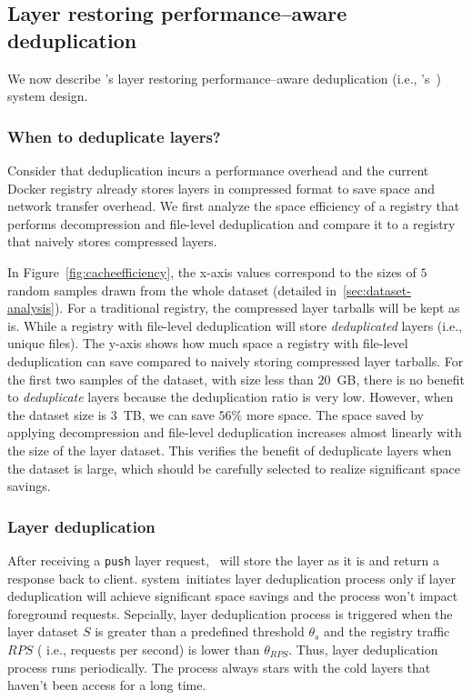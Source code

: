 \subsection{Layer restoring performance--aware deduplication}
\label{sec:dedup-desgin}

We now describe \sysname's layer restoring performance--aware deduplication 
 (i.e., \sysname's~\dedupname) system design. 

\subsubsection{When to deduplicate layers?}



Consider that deduplication incurs a performance overhead 
and the current Docker registry already stores layers in compressed format to 
save space and network transfer overhead. 
We first analyze the space efficiency of a registry 
 that performs decompression and file-level deduplication and compare it to 
 a registry that naively stores compressed layers.

In Figure~\ref{fig:cacheefficiency}, the x-axis values correspond to the sizes of $5$ random samples 
drawn from the whole dataset (detailed in~\cref{sec:dataset-analysis}). %
For a traditional registry, the compressed layer tarballs will be kept as is.
While a registry with file-level deduplication will store \emph{deduplicated} layers (i.e., unique files). 
The y-axis shows how much space a registry with file-level deduplication can save compared to naively storing compressed layer tarballs.
For the first two samples of the dataset, with size less than $20$~GB, 
there is no benefit to \emph{deduplicate} layers 
because the deduplication ratio is very low.
However, when the dataset size is $3$~TB, we can save $56\%$ more space.
The space saved by applying decompression and file-level deduplication increases almost linearly with the size of the layer dataset.
This verifies the benefit of deduplicate layers when the dataset is large, 
which should be carefully selected to realize significant space savings.

\subsubsection{Layer deduplication}

After receiving a \texttt{push} layer request, \sysname~will store the layer as it is and return a response back to client. 
\dedupname system~initiates layer deduplication process only if 
layer deduplication will achieve significant space savings and 
the process won't impact foreground requests. 
Sepcially, layer deduplication process is triggered when
the layer dataset $S$ is greater than a predefined threshold $\theta_{s}$ and 
the registry traffic $RPS$ ( i.e., requests per second) is lower than $\theta_{RPS}$. Thus, layer deduplication process runs periodically.
The process always stars with the cold layers that haven't been
access for a long time.
  

